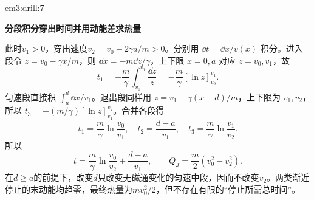 \begin{drillsolution}{em3:drill:7}
\par\medskip{}\noindent\textbf{分段积分穿出时间并用动能差求热量}\par\nobreak
此时$v_1>0$，穿出速度$v_2=v_0-2\gamma a/m>0$。分别用 $\dd t=\dd x/v(x)$ 积分。进入段令 $z=v_0-\gamma x/m$，则 $\dd x=-m\dd z/\gamma$，上下限 $x=0,a$ 对应 $z=v_0,v_1$，故
\[
t_1=-\frac m\gamma\int_{v_0}^{v_1}\frac{\dd z}{z}
=-\frac m\gamma[\ln z]_{v_0}^{v_1}.
\]
匀速段直接积 $\int_a^d\dd x/v_1$。退出段同样用 $z=v_1-\gamma(x-d)/m$，上下限为 $v_1,v_2$，所以
$t_3=-(m/\gamma)[\ln z]_{v_1}^{v_2}$。合并各段得
\[
 t_1=\frac m\gamma\ln\frac{v_0}{v_1},\quad
 t_2=\frac{d-a}{v_1},\quad
 t_3=\frac m\gamma\ln\frac{v_1}{v_2}.
\]
所以
\[
 \boxed{t=\frac m\gamma\ln\frac{v_0}{v_2}+\frac{d-a}{v_1}},
 \qquad
 \boxed{Q_J=\frac m2(v_0^2-v_2^2)}.
\]
在$d\ge a$的前提下，改变$d$只改变无磁通变化的匀速中段，因而不改变$v_2$。两类渐近停止的末动能均趋零，最终热量为$mv_0^2/2$，但不存在有限的“停止所需总时间”。
\end{drillsolution}
